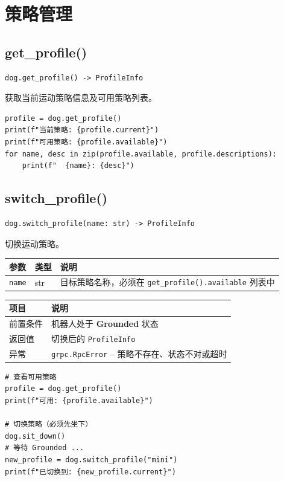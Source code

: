 \documentclass[a4paper,11pt,openany]{book}
\begin{document}
\section{策略管理}

\subsection{get\_profile()}

\begin{lstlisting}[style=python,numbers=none]
dog.get_profile() -> ProfileInfo
\end{lstlisting}

获取当前运动策略信息及可用策略列表。

\begin{lstlisting}[style=python]
profile = dog.get_profile()
print(f"当前策略: {profile.current}")
print(f"可用策略: {profile.available}")
for name, desc in zip(profile.available, profile.descriptions):
    print(f"  {name}: {desc}")
\end{lstlisting}

\subsection{switch\_profile()}

\begin{lstlisting}[style=python,numbers=none]
dog.switch_profile(name: str) -> ProfileInfo
\end{lstlisting}

切换运动策略。

\begin{longtable}{lll}
\toprule
参数 & 类型 & 说明 \\
\midrule
\endhead
\texttt{name} & str & 目标策略名称，必须在 \texttt{get\_profile().available} 列表中 \\
\bottomrule
\end{longtable}

\begin{longtable}{ll}
\toprule
项目 & 说明 \\
\midrule
\endhead
前置条件 & 机器人处于 \textbf{Grounded} 状态 \\
返回值 & 切换后的 \texttt{ProfileInfo} \\
异常 & \texttt{grpc.RpcError} -- 策略不存在、状态不对或超时 \\
\bottomrule
\end{longtable}

\begin{lstlisting}[style=python]
# 查看可用策略
profile = dog.get_profile()
print(f"可用: {profile.available}")

# 切换策略（必须先坐下）
dog.sit_down()
# 等待 Grounded ...
new_profile = dog.switch_profile("mini")
print(f"已切换到: {new_profile.current}")
\end{lstlisting}
\end{document}
